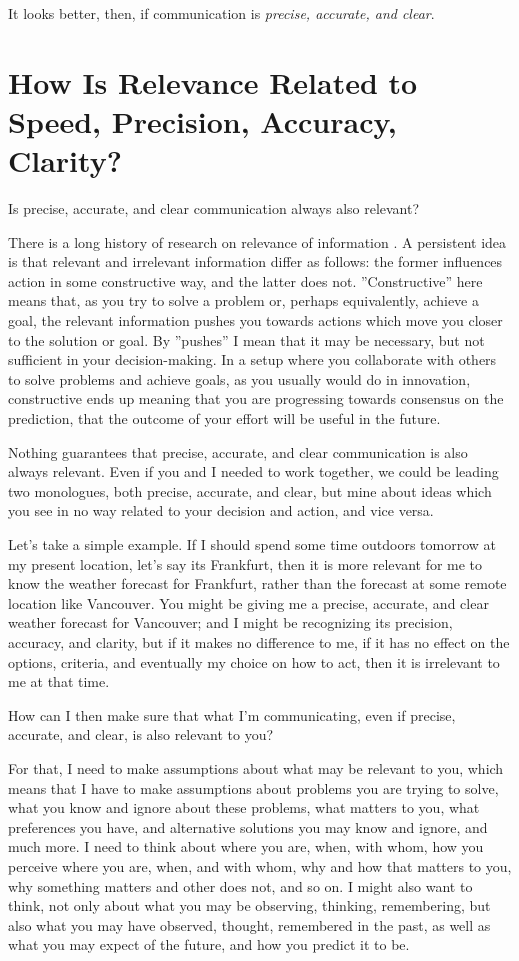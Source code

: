 \documentclass[graybox,envcountchap,sectrefs]{svmono}
\begin{document}
It looks better, then, if communication is \textit{precise, accurate, and clear}.


\section{How Is Relevance Related to Speed, Precision, Accuracy, Clarity?}
\label{c2:s6}
Is precise, accurate, and clear communication always also relevant?

There is a long history of research on relevance of information \cite{sperber1986relevance,sperber1995relevance,mizzaro1997relevance}. A persistent idea is that relevant and irrelevant information differ as follows: the former influences action in some constructive way, and the latter does not. ''Constructive'' here means that, as you try to solve a problem or, perhaps equivalently, achieve a goal, the relevant information pushes you towards actions which move you closer to the solution or goal. By ''pushes'' I mean that it may be necessary, but not sufficient in your decision-making. In a setup where you collaborate with others to solve problems and achieve goals, as you usually would do in innovation, constructive ends up meaning that you are progressing towards consensus on the prediction, that the outcome of your effort will be useful in the future.

Nothing guarantees that precise, accurate, and clear communication is also always relevant. Even if you and I needed to work together, we could be leading two monologues, both precise, accurate, and clear, but mine about ideas which you see in no way related to your decision and action, and vice versa.

Let's take a simple example. If I should spend some time outdoors tomorrow at my present location, let's say its Frankfurt, then it is more relevant for me to know the weather forecast for Frankfurt, rather than the forecast at some remote location like Vancouver. You might be giving me a precise, accurate, and clear weather forecast for Vancouver; and I might be recognizing its precision, accuracy, and clarity, but if it makes no difference to me, if it has no effect on the options, criteria, and eventually my choice on how to act, then it is irrelevant to me at that time.

How can I then make sure that what I'm communicating, even if precise, accurate, and clear, is also relevant to you? 

For that, I need to make assumptions about what may be relevant to you, which means that I have to make assumptions about problems you are trying to solve, what you know and ignore about these problems, what matters to you, what preferences you have, and alternative solutions you may know and ignore, and much more. I need to think about where you are, when, with whom, how you perceive where you are, when, and with whom, why and how that matters to you, why something matters and other does not, and so on. I might also want to think, not only about what you may be observing, thinking, remembering, but also what you may have observed, thought, remembered in the past, as well as what you may expect of the future, and how you predict it to be. 
\end{document}
